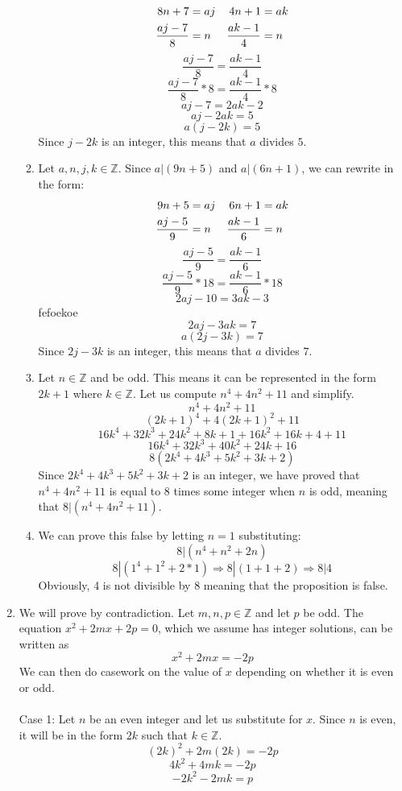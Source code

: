 \documentclass{article}
\begin{document}
\begin{enumerate}[label=\textbf{\arabic*}.]
\begin{enumerate}[label=\textbf{\alph*}.]
\begin{align}
            8n+7 &= aj   &   4n+1 &= ak \\ \notag
            \frac{aj-7}{8} &= n &  \frac{ak-1}{4} &= n
        \end{align}
        \[\frac{aj-7}{8} = \frac{ak-1}{4}\]
        \[\frac{aj-7}{8}*8 = \frac{ak-1}{4}*8\]
        \[aj-7=2ak-2\]
        \[aj-2ak=5\]
        \[a(j-2k)=5\]
        Since $j-2k$ is an integer, this means that $a$ divides $5$.
        \item Let $a,n,j,k \in \mathbb{Z}$. Since $a|(9n+5)$ and $a|(6n+1)$, we can rewrite in the form: 
        \begin{align}\notag
            9n+5 &= aj   &   6n+1 &= ak \\ \notag
            \frac{aj-5}{9} &= n &  \frac{ak-1}{6} &= n
        \end{align}
        \[\frac{aj-5}{9} = \frac{ak-1}{6}\]
        \[\frac{aj-5}{9}*18 = \frac{ak-1}{6}*18\]
        \[2aj-10=3ak-3\]fefoekoe
        \[2aj-3ak=7\]
        \[a(2j-3k)=7\]
        Since $2j-3k$ is an integer, this means that $a$ divides $7$.
        \item Let $n \in \mathbb{Z}$ and be odd. This means it can be represented in the form $2k+1$ where $k \in \mathbb{Z}$. Let us compute $n^4+4n^2+11$ and simplify.
        \[n^4+4n^2+11\]
        \[(2k+1)^4+4(2k+1)^2+11\]
        \[16k^4+32k^3+24k^2+8k+1+16k^2+16k+4+11\]
        \[16k^4+32k^3+40k^2+24k+16\]
        \[8(2k^4+4k^3+5k^2+3k+2)\]
        Since $2k^4+4k^3+5k^2+3k+2$ is an integer, we have proved that $n^4+4n^2+11$ is equal to $8$ times some integer when $n$ is odd, meaning that $8|(n^4+4n^2+11)$.
        \item We can prove this false by letting $n=1$ substituting:
        \[8|(n^4+n^2+2n)\]
        \[8|(1^4+1^2+2*1) \Rightarrow 8|(1+1+2) \Rightarrow 8|4\]
        Obviously, 4 is not divisible by 8 meaning that the proposition is false.
    \end{enumerate}
    \item We will prove by contradiction. Let $m,n,p \in \mathbb{Z}$ and let $p$ be odd. The equation $x^2+2mx+2p=0$, which we assume has integer solutions, can be written as
    \[x^2+2mx=-2p\]
    We can then do casework on the value of $x$ depending on whether it is even or odd. \\\\
    Case 1: Let $n$ be an even integer and let us substitute for $x$. Since $n$ is even, it will be in the form $2k$ such that $k \in \mathbb{Z}$.
    \[(2k)^2+2m(2k)=-2p\]
    \[4k^2+4mk=-2p\]
    \[-2k^2-2mk=p\]

\end{enumerate}
\end{document}
